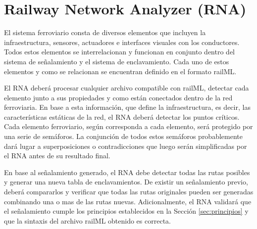 \chapter{Railway Network Analyzer (RNA)}
    \label{sec:RNA}

    El sistema ferroviario consta de diversos elementos que incluyen la infraestructura, sensores, actuadores  e interfaces visuales con los conductores. Todos estos elementos se interrelacionan y funcionan en conjunto dentro del sistema de señalamiento y el sistema de enclavamiento. Cada uno de estos elementos y como se relacionan se encuentran definido en el formato railML. 

    El RNA deberá procesar cualquier archivo compatible con railML, detectar cada elemento junto a sus propiedades y como están conectados dentro de la red ferroviaria. En base a esta información, que define la infraestructura, es decir, las características estáticas de la red, el RNA deberá detectar los puntos críticos. Cada elemento ferroviario, según corresponda a cada elemento, será protegido por una serie de semáforos. La conjunción de todos estos semáforos probablemente dará lugar a superposiciones o contradicciones que luego serán simplificadas por el RNA antes de su resultado final.

    En base al señalamiento generado, el RNA debe detectar todas las rutas posibles y generar una nueva tabla de enclavamientos. De existir un señalamiento previo, deberá compararlos y verificar que todas las rutas originales pueden ser generadas combinando una o mas de las rutas nuevas. Adicionalmente, el RNA validará que el señalamiento cumple los principios establecidos en la Sección \ref{sec:principios} y que la sintaxis del archivo railML obtenido es correcta.    

    
    
    
    
    
    